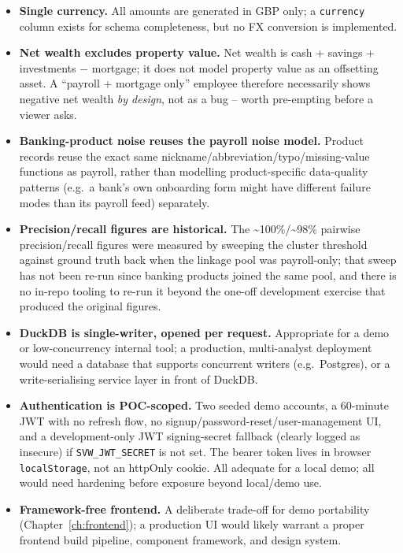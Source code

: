 \documentclass[11pt]{report}
\newcommand{\code}[1]{\lstinline[style=plain]!#1!}
\begin{document}
\begin{itemize}
\item \textbf{Single currency.} All amounts are generated in GBP only; a \code{currency} column exists for schema completeness, but no FX conversion is implemented.
\item \textbf{Net wealth excludes property value.} Net wealth is cash + savings + investments $-$ mortgage; it does not model property value as an offsetting asset. A ``payroll + mortgage only'' employee therefore necessarily shows negative net wealth \emph{by design}, not as a bug -- worth pre-empting before a viewer asks.
\item \textbf{Banking-product noise reuses the payroll noise model.} Product records reuse the exact same nickname/abbreviation/typo/missing-value functions as payroll, rather than modelling product-specific data-quality patterns (e.g.\ a bank's own onboarding form might have different failure modes than its payroll feed) separately.
\item \textbf{Precision/recall figures are historical.} The \textasciitilde100\%/\textasciitilde98\% pairwise precision/recall figures were measured by sweeping the cluster threshold against ground truth back when the linkage pool was payroll-only; that sweep has not been re-run since banking products joined the same pool, and there is no in-repo tooling to re-run it beyond the one-off development exercise that produced the original figures.
\item \textbf{DuckDB is single-writer, opened per request.} Appropriate for a demo or low-concurrency internal tool; a production, multi-analyst deployment would need a database that supports concurrent writers (e.g.\ Postgres), or a write-serialising service layer in front of DuckDB.
\item \textbf{Authentication is POC-scoped.} Two seeded demo accounts, a 60-minute JWT with no refresh flow, no signup/password-reset/user-management UI, and a development-only JWT signing-secret fallback (clearly logged as insecure) if \code{SVW_JWT_SECRET} is not set. The bearer token lives in browser \code{localStorage}, not an httpOnly cookie. All adequate for a local demo; all would need hardening before exposure beyond local/demo use.
\item \textbf{Framework-free frontend.} A deliberate trade-off for demo portability (Chapter~\ref{ch:frontend}); a production UI would likely warrant a proper frontend build pipeline, component framework, and design system.
\end{itemize}
\end{document}
